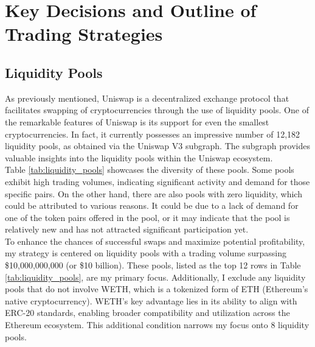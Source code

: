 \chapter{Key Decisions and Outline of Trading Strategies}

\section{Liquidity Pools}
As previously mentioned, Uniswap is a decentralized exchange protocol that facilitates swapping of cryptocurrencies through the use of liquidity pools. One of the remarkable features of Uniswap is its support for even the smallest cryptocurrencies. In fact, it currently possesses an impressive number of 12,182 liquidity pools, as obtained via the Uniswap V3 subgraph. The subgraph provides valuable insights into the liquidity pools within the Uniswap ecosystem.
\\[5mm]
Table \ref{tab:liquidity_pools} showcases the diversity of these pools. Some pools exhibit high trading volumes, indicating significant activity and demand for those specific pairs. On the other hand, there are also pools with zero liquidity, which could be attributed to various reasons. It could be due to a lack of demand for one of the token pairs offered in the pool, or it may indicate that the pool is relatively new and has not attracted significant participation yet.
\\[5mm]
To enhance the chances of successful swaps and maximize potential profitability, my strategy is centered on liquidity pools with a trading volume surpassing \$10,000,000,000 (or \$10 billion). These pools, listed as the top 12 rows in Table \ref{tab:liquidity_pools}, are my primary focus. Additionally, I exclude any liquidity pools that do not involve WETH, which is a tokenized form of ETH (Ethereum's native cryptocurrency). WETH's key advantage lies in its ability to align with ERC-20 standards, enabling broader compatibility and utilization across the Ethereum ecosystem. This additional condition narrows my focus onto 8 liquidity pools.

